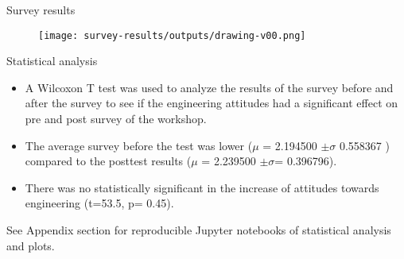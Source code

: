 {


\begin{frame}{Survey results}
      \begin{figure}
        \centering
        \texttt{[image: survey-results/outputs/drawing-v00.png]}
      \end{figure}
\end{frame}
}



{

\begin{frame}{Statistical analysis}

\begin{itemize}
\item A Wilcoxon T test was used to analyze the results of the survey before and after the survey to see if the engineering attitudes had a significant effect on pre and post survey of the workshop.
\item The average survey before the test was lower ($\mu$ = 2.194500 $\pm \sigma$ 0.558367 ) compared to the posttest results ($\mu$ = 2.239500 $\pm \sigma$= 0.396796).
\item There was no statistically significant in the increase of attitudes towards engineering (t=53.5, p= 0.45).
\end{itemize}

See Appendix section for reproducible Jupyter notebooks of statistical analysis and plots.

\end{frame}
}




